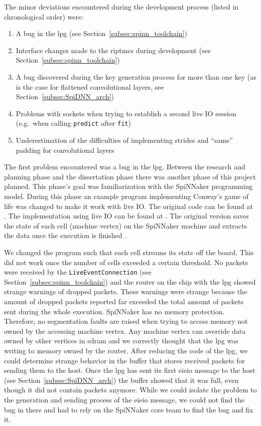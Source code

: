\documentclass[]{article}
\begin{document}
The minor deviations encountered during the development process
(listed in chronological order) were:

\begin{enumerate}
  \item A bug in the \acrshort{lpg} (see Section~\ref{subsec:spinn_toolchain})
  \item Interface changes made to the \acrshort{riptmcs} during development (see
    Section~\ref{subsec:spinn_toolchain})
  \item A bug discovered during the key generation process for more
    than one key (as is the case for flattened convolutional layers,
    see Section~\ref{subsec:SpiDNN_arch})
  \item Problems with sockets when trying to establish a second live
    IO session (e.g.\ when calling \texttt{predict} after
    \texttt{fit})
  \item Underestimation of the difficulties of implementing strides
    and ``same'' padding for convolutional layers
\end{enumerate}

The first problem encountered was a bug in the \acrshort{lpg}.
Between the research and planning phase and the dissertation phase
there was another phase of this project planned.
This phase's goal was familiarization with the SpiNNaker programming
model.
During this phase an example program implementing Conway's game of
life \citep{gardener_1970, furber_et_al_2020} was changed to make it
work with live IO.
The original code can be found at \citet{spinnaker_2020b}.
The implementation using live IO can be found at
\citet{fassbender_2020}.
The original version saves the state of each cell (machine vertex)
on the SpiNNaker machine and extracts the data once the execution is
finished \citep{furber_et_al_2020, spinnaker_2020b}.

We changed the program such that each cell streams its state off the
board.
This did not work once the number of cells exceeded
a certain threshold.
No packets were received by the \texttt{LiveEventConnection}
(see Section~\ref{subsec:spinn_toolchain}) and the router on the
chip with the \acrshort{lpg} showed strange warnings of dropped packets.
These warnings were strange because the amount of dropped packets
reported far exceeded the total amount of packets sent during the
whole execution.
SpiNNaker has no memory protection.
Therefore, no segmentation faults are raised when
trying to access memory not owned by the accessing machine vertex.
Any machine vertex can override data owned by other vertices in \acrshort{sdram}
and we correctly thought that the \acrshort{lpg} was writing to memory owned by
the router.
After reducing the code of the \acrshort{lpg}, we could determine strange
behavior in the buffer that stores received packets for sending them
to the host.
Once the \acrshort{lpg} has sent its first \acrshort{eieio} message to the host
(see Section~\ref{subsec:SpiDNN_arch}) the buffer showed that it was
full, even though it did not contain packets anymore.
While we could isolate the problem to the generation and sending
process of the \acrshort{eieio} message, we could not find the bug in there
and had to rely on the SpiNNaker core team to find the bug and fix it.
\end{document}
